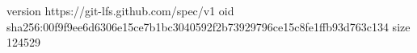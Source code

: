 version https://git-lfs.github.com/spec/v1
oid sha256:00f9f9ee6d6306e15ce7b1bc3040592f2b73929796ce15c8fe1ffb93d763c134
size 124529
